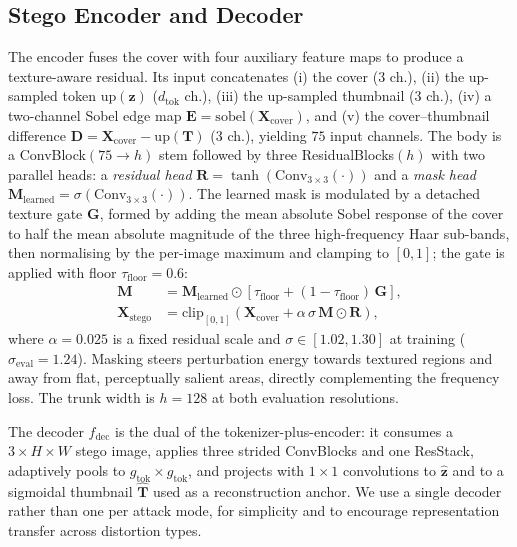 \documentclass[conference]{IEEEtran}
\begin{document}
\subsection{Stego Encoder and Decoder}
\label{sec:enc}
The encoder fuses the cover with four auxiliary feature maps to produce a texture-aware residual. Its input concatenates (i) the cover ($3$ ch.), (ii) the up-sampled token $\mathrm{up}(\mathbf{z})$ ($d_{\text{tok}}$ ch.), (iii) the up-sampled thumbnail ($3$ ch.), (iv) a two-channel Sobel edge map $\mathbf{E}=\mathrm{sobel}(\mathbf{X}_{\text{cover}})$, and (v) the cover--thumbnail difference $\mathbf{D}=\mathbf{X}_{\text{cover}}-\mathrm{up}(\mathbf{T})$ ($3$ ch.), yielding $75$ input channels. The body is a ConvBlock$(75\!\to\!h)$ stem followed by three ResidualBlocks$(h)$ with two parallel heads: a \emph{residual head} $\mathbf{R}=\tanh(\text{Conv}_{3\times3}(\cdot))$ and a \emph{mask head} $\mathbf{M}_{\text{learned}}=\sigma(\text{Conv}_{3\times3}(\cdot))$. The learned mask is modulated by a detached texture gate $\mathbf{G}$, formed by adding the mean absolute Sobel response of the cover to half the mean absolute magnitude of the three high-frequency Haar sub-bands, then normalising by the per-image maximum and clamping to $[0,1]$; the gate is applied with floor $\tau_{\text{floor}}=0.6$:
\begin{align}
    \mathbf{M} &= \mathbf{M}_{\text{learned}} \odot \left[\tau_{\text{floor}} + (1-\tau_{\text{floor}})\,\mathbf{G}\right], \label{eq:mask}\\
    \mathbf{X}_{\text{stego}} &= \mathrm{clip}_{[0,1]}\!\left(\mathbf{X}_{\text{cover}}+\alpha\,\sigma\,\mathbf{M}\odot\mathbf{R}\right),
    \label{eq:stego}
\end{align}
where $\alpha\!=\!0.025$ is a fixed residual scale and $\sigma\!\in\![1.02,1.30]$ at training ($\sigma_{\text{eval}}\!=\!1.24$). Masking steers perturbation energy towards textured regions and away from flat, perceptually salient areas, directly complementing the frequency loss. The trunk width is $h\!=\!128$ at both evaluation resolutions.

The decoder $f_{\text{dec}}$ is the dual of the tokenizer-plus-encoder: it consumes a $3\!\times\!H\!\times\!W$ stego image, applies three strided ConvBlocks and one ResStack, adaptively pools to $g_{\text{tok}}\!\times\!g_{\text{tok}}$, and projects with $1\!\times\!1$ convolutions to $\hat{\mathbf{z}}$ and to a sigmoidal thumbnail $\hat{\mathbf{T}}$ used as a reconstruction anchor. We use a single decoder rather than one per attack mode, for simplicity and to encourage representation transfer across distortion types.
\end{document}
